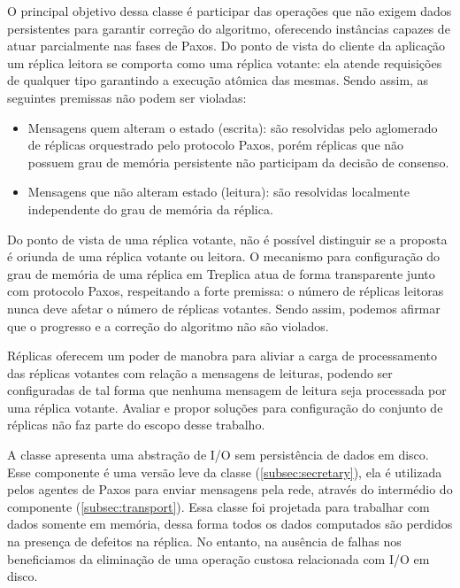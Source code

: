 O principal objetivo dessa classe é participar das operações que não exigem dados
persistentes para garantir correção do algoritmo, oferecendo instâncias capazes de atuar
parcialmente nas fases de Paxos. Do ponto de vista do cliente da aplicação um réplica
leitora se comporta como uma réplica votante: ela atende requisições de qualquer tipo
garantindo a execução atômica das mesmas. Sendo assim, as seguintes premissas não podem
ser violadas:

\begin{itemize}
  \item Mensagens quem alteram o estado (escrita): são resolvidas pelo aglomerado de
    réplicas orquestrado pelo protocolo Paxos, porém réplicas que não possuem grau de
    memória persistente não participam da decisão de consenso.
  \item Mensagens que não alteram estado (leitura): são resolvidas localmente independente
    do grau de memória da réplica.
\end{itemize}

Do ponto de vista de uma réplica votante, não é possível distinguir se a proposta é
oriunda de uma réplica votante ou leitora. O mecanismo para configuração do grau de
memória de uma réplica em Treplica atua de forma transparente junto com protocolo Paxos,
respeitando a forte premissa: o número de réplicas leitoras nunca deve afetar o número de
réplicas votantes. Sendo assim, podemos afirmar que o progresso e a correção do algoritmo
não são violados.

Réplicas oferecem um poder de manobra para aliviar a carga de processamento das réplicas
votantes com relação a mensagens de leituras, podendo ser configuradas de tal forma que
nenhuma mensagem de leitura seja processada por uma réplica votante. Avaliar e propor
soluções para configuração do conjunto de réplicas não faz parte do escopo desse trabalho.


A classe  apresenta uma abstração de I/O sem persistência de
dados em disco. Esse componente é uma versão leve da classe 
(\autoref{subsec:secretary}), ela é utilizada pelos agentes de Paxos para enviar mensagens
pela rede, através do intermédio do componente 
(\autoref{subsec:transport}). Essa classe foi projetada para trabalhar com dados somente
em memória, dessa forma todos os dados computados são perdidos na presença de defeitos na
réplica. No entanto, na ausência de falhas nos beneficiamos da eliminação de uma operação
custosa relacionada com I/O em disco.

